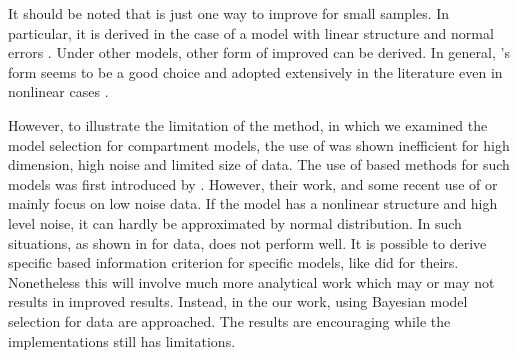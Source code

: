 It should be noted that \aicc is just one way to improve \aic for small
samples. In particular, it is derived in the case of a model with linear
structure and normal errors \parencite{Hurvich1989, Burnham2002}. Under other
models, other form of improved \aic can be derived. In general,
\textcite{Hurvich1989}'s form seems to be a good choice and adopted
extensively in the literature even in nonlinear cases
\parencite[e.g.][]{Turkheimer2003}.

However, to illustrate the limitation of the \aicc method, in
\textcite{Zhou2011} which we examined the model selection for compartment
models, the use of \aicc was shown inefficient for high dimension, high noise
and limited size of data. The use of \aic based methods for such models was
first introduced by \textcite{Hawkins1986}. However, their work, and some
recent use of \aic or \aicc mainly focus on low noise data. If the model has a
nonlinear structure and high level noise, it can hardly be approximated by
normal distribution. In such situations, as shown in \textcite{Zhou2011} for
\pet data, \aicc does not perform well. It is possible to derive specific \aic
based information criterion for specific models, like \textcite{Hurvich1989}
did for theirs. Nonetheless this will involve much more analytical work which
may or may not results in improved results. Instead, in the our work, using
Bayesian model selection for \pet data are approached. The results are
encouraging while the implementations still has limitations.  \endfirstyear
